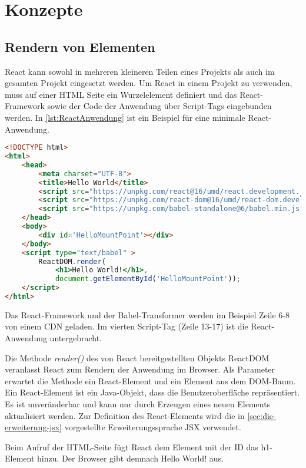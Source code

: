 \section{Konzepte}

\subsection{Rendern von Elementen}
React kann sowohl in mehreren kleineren Teilen eines Projekts als auch im gesamten Projekt eingesetzt werden. Um React in einem Projekt zu verwenden, muss auf einer HTML Seite ein Wurzelelement definiert und das React-Framework sowie der Code der Anwendung über Script-Tags eingebunden werden. In \autoref{lst:ReactAnwendung} ist ein Beispiel für eine minimale React-Anwendung. 

\begin{lstlisting}[caption=Beispiel einer minimalen React-Anwendung , label=lst:ReactAnwendung, language=HTML]
<!DOCTYPE html>
<html>
	<head>
		<meta charset="UTF-8">
		<title>Hello World</title>
		<script src="https://unpkg.com/react@16/umd/react.development.js" crossorigin></script>
		<script src="https://unpkg.com/react-dom@16/umd/react-dom.development.js" crossorigin></script>
		<script src="https://unpkg.com/babel-standalone@6/babel.min.js"></script>
	</head>
	<body>
		<div id='HelloMountPoint'></div>
	</body>
	<script type="text/babel" >
		ReactDOM.render(
			<h1>Hello World!</h1>, 
			document.getElementById('HelloMountPoint'));
	</script>
</html>
\end{lstlisting}

Das React-Framework und der Babel-Transformer werden im Beispiel Zeile 6-8 von einem CDN geladen. Im vierten Script-Tag (Zeile 13-17) ist die React-Anwendung untergebracht. 

Die Methode \textit{render()} des von React bereitgestellten Objekts ReactDOM veranlasst React zum Rendern der Anwendung im Browser. Als Parameter erwartet die Methode ein React-Element und ein Element aus dem DOM-Baum. Ein React-Element ist ein Java-Objekt, dass die Benutzeroberfläche repräsentiert. Es ist unveränderbar und kann nur durch Erzeugen eines neuen Elements aktualisiert werden. Zur Definition des React-Elements wird die in \autoref{sec:die-erweiterung-jsx} vorgestellte Erweiterungssprache JSX verwendet.

Beim Aufruf der HTML-Seite fügt React dem Element mit der ID \glqq {} das h1-Element hinzu. Der Browser gibt demnach \glqq Hello World!\grqq{} aus. \autocites[vgl.][4\psqq, 26\psqq]{Zeigermann.2016}[vgl.][]{Facebook.2018}[vgl.][]{Facebook.2018c}[vgl.][2\psqq]{Stefanov.2017}

